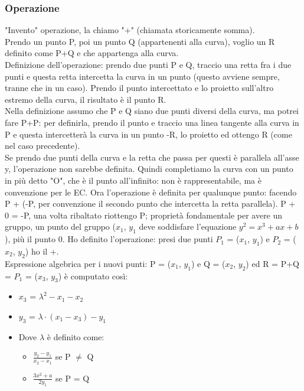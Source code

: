 \documentclass[16px]{article}
\begin{document}
\subsubsection{Operazione}
"Invento" operazione, la chiamo "+" (chiamata storicamente somma).\\ Prendo un punto P, poi un punto Q (appartenenti alla curva), voglio un R definito come P+Q e che appartenga alla curva.\\ Definizione dell'operazione: prendo due punti P e Q, traccio una retta fra i due punti e questa retta intercetta la curva in un punto (questo avviene sempre, tranne che in un caso). Prendo il punto intercettato e lo proietto sull'altro estremo della curva, il risultato è il punto R.\\ Nella definizione assumo che P e Q siano due punti diversi della curva, ma potrei fare P+P: per definirla, prendo il punto e traccio una linea tangente alla curva in P e questa intercetterà la curva in un punto -R, lo proietto ed ottengo R (come nel caso precedente).\\ Se prendo due punti della curva e la retta che passa per questi è parallela all'asse y, l'operazione non sarebbe definita. Quindi completiamo la curva con un punto in più detto "O", che è il punto all'infinito: non è rappresentabile, ma è convenzione per le EC. Ora l'operazione è definita per qualunque punto: facendo P + (-P, per convenzione il secondo punto che intercetta la retta parallela). P + 0 = -P, una volta ribaltato riottengo P; proprietà fondamentale per avere un gruppo, un punto del gruppo ($x_1$, $y_1$ deve soddisfare l'equazione $y^2 = x^3 +ax + b$), più il punto 0. Ho definito l'operazione: presi due punti $P_1$ = ($x_1$, $y_1$) e $P_2$ = ($x_2$, $y_2$) ho il +.\\ Espressione algebrica per i nuovi punti: P = ($x_1$, $y_1$) e Q = ($x_2$, $y_2$) ed R = P+Q = $P_1$ = ($x_3$, $y_3$) è computato così:
\begin{itemize}
\item $x_3$ = $\lambda^2 - x_1 - x_2$
\item $y_3$ = $\lambda\cdot (x_1 - x_3) -y_1$
\item Dove $\lambda$ è definito come:
\begin{itemize}
\item $\frac{y_2 - y_1}{x_2 - x_1}$ se P $\neq$ Q
\item $\frac{3x^2 + a}{2y_1}$ se P = Q
\end{itemize} 
\end{itemize}
\end{document}
